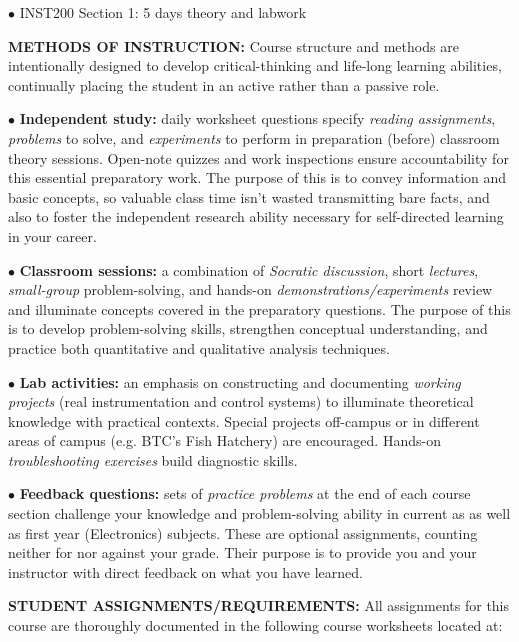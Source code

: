 \vskip 5pt

\item{$\bullet$} INST200 Section 1: 5 days theory and labwork

\vskip 10pt

\noindent
{\bf METHODS OF INSTRUCTION:} Course structure and methods are intentionally designed to develop critical-thinking and life-long learning abilities, continually placing the student in an active rather than a passive role.  

\item{$\bullet$} {\bf Independent study:} daily worksheet questions specify {\it reading assignments}, {\it problems} to solve, and {\it experiments} to perform in preparation (before) classroom theory sessions.  Open-note quizzes and work inspections ensure accountability for this essential preparatory work.  The purpose of this is to convey information and basic concepts, so valuable class time isn't wasted transmitting bare facts, and also to foster the independent research ability necessary for self-directed learning in your career.
\item{$\bullet$} {\bf Classroom sessions:} a combination of {\it Socratic discussion}, short {\it lectures}, {\it small-group} problem-solving, and hands-on {\it demonstrations/experiments} review and illuminate concepts covered in the preparatory questions.  The purpose of this is to develop problem-solving skills, strengthen conceptual understanding, and practice both quantitative and qualitative analysis techniques.
\item{$\bullet$} {\bf Lab activities:} an emphasis on constructing and documenting {\it working projects} (real instrumentation and control systems) to illuminate theoretical knowledge with practical contexts.  Special projects off-campus or in different areas of campus (e.g. BTC's Fish Hatchery) are encouraged.  Hands-on {\it troubleshooting exercises} build diagnostic skills.
\item{$\bullet$} {\bf Feedback questions:} sets of {\it practice problems} at the end of each course section challenge your knowledge and problem-solving ability in current as as well as first year (Electronics) subjects.  These are optional assignments, counting neither for nor against your grade.  Their purpose is to provide you and your instructor with direct feedback on what you have learned.

\vskip 10pt

\noindent
{\bf STUDENT ASSIGNMENTS/REQUIREMENTS:} All assignments for this course are thoroughly documented in the following course worksheets located at:

